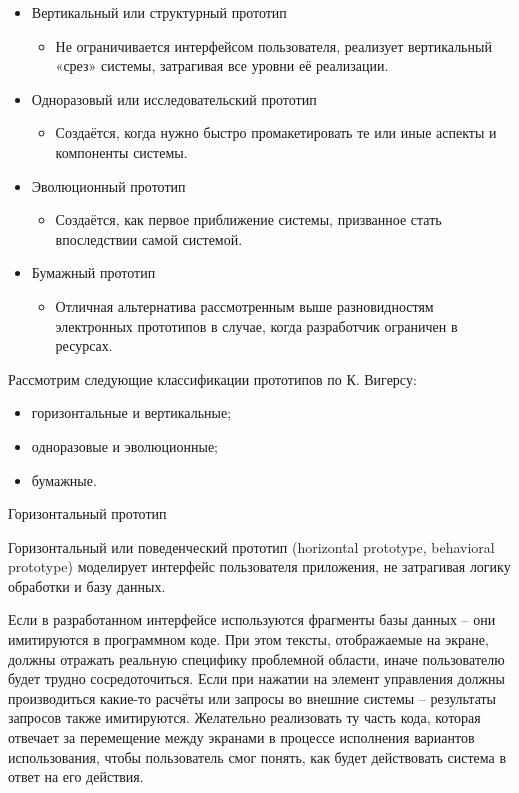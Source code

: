 \documentclass{../industrial-development}
\begin{document}
{\begin{frame}
\begin{itemize}
\item \alert{Вертикальный или структурный прототип} \begin{itemize}
\item Не ограничивается интерфейсом пользователя, реализует вертикальный «срез» системы, затрагивая все уровни её реализации.
\end{itemize}

\item \alert{Одноразовый или исследовательский прототип} 
\begin{itemize}
\item Создаётся, когда нужно быстро промакетировать те или иные аспекты и компоненты системы.
\end{itemize}
\item \alert{Эволюционный прототип} 
\begin{itemize} 
\item Создаётся, как первое приближение системы, призванное стать впоследствии самой системой.
\end{itemize}
\item \alert{Бумажный прототип} 
\begin{itemize}
\item Отличная альтернатива рассмотренным выше разновидностям электронных прототипов в случае, когда разработчик ограничен в
ресурсах.
\end{itemize}
\end{itemize}
\end{frame}

\lecturenotes

Рассмотрим следующие классификации прототипов по К. Вигерсу:

\begin{itemize}
\item горизонтальные и вертикальные;
\item одноразовые и эволюционные;
\item бумажные.
\end{itemize}

\alert{Горизонтальный прототип}

Горизонтальный или поведенческий прототип (horizontal prototype, behavioral prototype) моделирует интерфейс пользователя приложения, не затрагивая логику обработки и базу данных.

Если в разработанном интерфейсе используются фрагменты базы данных – они имитируются в программном коде. При этом тексты, отображаемые на экране, должны отражать реальную специфику проблемной области, иначе пользователю будет трудно сосредоточиться. Если при нажатии на элемент управления должны производиться какие-то расчёты или запросы во внешние системы – результаты запросов также имитируются.
Желательно реализовать ту часть кода, которая отвечает за перемещение между экранами в процессе исполнения вариантов использования, чтобы пользователь смог понять, как будет действовать система в ответ на его действия.

}
\end{document}
